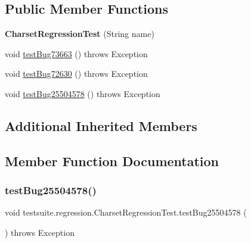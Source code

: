 \subsection*{Public Member Functions}
\begin{DoxyCompactItemize}
\item 
\mbox{\label{classtestsuite_1_1regression_1_1_charset_regression_test_ad8877969c709ae03cc43ffd7a0db64fd}} 
{\bfseries Charset\+Regression\+Test} (String name)
\item 
void \mbox{\hyperlink{classtestsuite_1_1regression_1_1_charset_regression_test_a46c2702ffcbb3408a1b7fe21ba7b02d5}{test\+Bug73663}} ()  throws Exception 
\item 
void \mbox{\hyperlink{classtestsuite_1_1regression_1_1_charset_regression_test_aea47a9d0535dd2e8b09f2be63c4c5100}{test\+Bug72630}} ()  throws Exception 
\item 
void \mbox{\hyperlink{classtestsuite_1_1regression_1_1_charset_regression_test_a576343bc13a21ec028c8341e914f7e84}{test\+Bug25504578}} ()  throws Exception 
\end{DoxyCompactItemize}
\subsection*{Additional Inherited Members}


\subsection{Member Function Documentation}
\mbox{\label{classtestsuite_1_1regression_1_1_charset_regression_test_a576343bc13a21ec028c8341e914f7e84}} 
\subsubsection{\texorpdfstring{test\+Bug25504578()}{testBug25504578()}}
{\footnotesize\ttfamily void testsuite.\+regression.\+Charset\+Regression\+Test.\+test\+Bug25504578 (\begin{DoxyParamCaption}{ }\end{DoxyParamCaption}) throws Exception}

